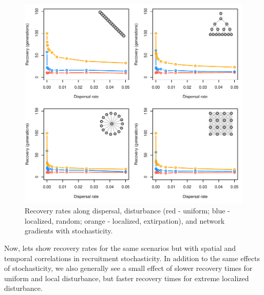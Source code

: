 \documentclass[]{article}
\begin{document}
\begin{figure}[H]

{\centering \includegraphics{Managing_for_ecological_surprises_in_metapopulations_makeHTML_files/figure-latex/stochastic recruitment-1} 

}

\caption{Recovery rates along dispersal, disturbance (red - uniform; blue - localized, random; orange - localized, extirpation), and network gradients with stochasticity.}\label{fig:stochastic recruitment}
\end{figure}
\newpage

Now, lets show recovery rates for the same scenarios but with spatial
and temporal correlations in recruitment stochasticity. In addition to
the same effects of stochasticity, we also generally see a small effect
of slower recovery times for uniform and local disturbance, but faster
recovery times for extreme localized disturbance.
\end{document}
